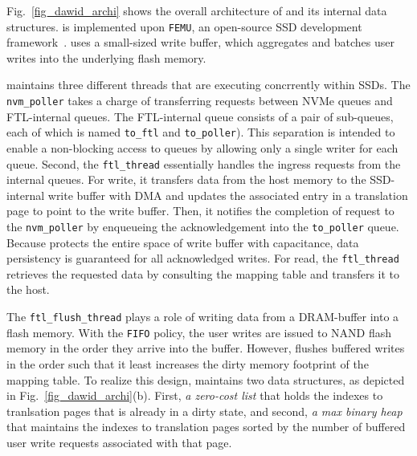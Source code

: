 Fig.~\ref{fig_dawid_archi} shows the overall
architecture of \ours{} and its internal data structures. 
\ours{} is implemented upon \texttt{FEMU}, an open-source SSD development
framework~\cite{li2018case}. 
\ours{} uses a small-sized write buffer, which aggregates and  
batches user writes into the underlying flash memory.  


\ours{} maintains three different threads that are executing concrrently
within SSDs.  The \texttt{nvm\_poller} takes a charge of transferring requests
between NVMe queues and FTL-internal queues. The FTL-internal queue consists of
a pair of sub-queues, each of which is named \texttt{to\_ftl} and
\texttt{to\_poller}). This separation is intended to enable a non-blocking
access to queues by allowing only a single writer for each queue.  Second, the
\texttt{ftl\_thread} essentially handles the ingress requests from the internal
queues. For write, it transfers data from the host memory to the SSD-internal
write buffer with DMA and updates the associated entry in a translation page to
point to the write buffer. Then, it notifies the completion of request to the
\texttt{nvm\_poller} by enqueueing the acknowledgement into the
\texttt{to\_poller} queue.  Because \ours{} protects the entire space of write
buffer with capacitance, data persistency is guaranteed for all acknowledged
writes.  For read, the \texttt{ftl\_thread} retrieves the requested data by
consulting the mapping table and transfers it to the host. 

The \texttt{ftl\_flush\_thread} plays a role of writing data from a DRAM-buffer
into a flash memory.  With the \texttt{FIFO} policy, the user writes are issued
to NAND flash memory in the order they arrive into the buffer. However, \ours{}
flushes buffered writes in the order such that it least increases the dirty memory
footprint of the mapping table.  To realize this design, \ours{} maintains two
data structures, as depicted in Fig.~\ref{fig_dawid_archi}(b). First, \textit{a
zero-cost list} that holds the indexes to tranlsation pages that is already
in a dirty state, and second, \textit{a max binary heap} that
maintains the indexes to translation pages sorted by the number of buffered
user write requests associated with that page.  

